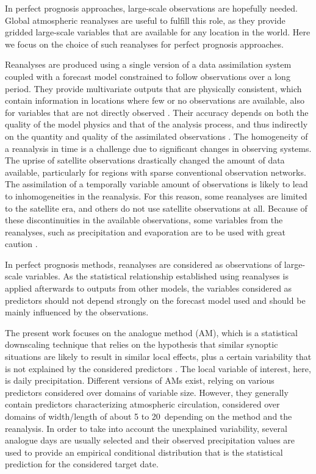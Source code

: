 \documentclass[smallextended]{svjour3}       %
\begin{document}
	In perfect prognosis approaches, large-scale observations are hopefully needed. Global atmospheric reanalyses are useful to fulfill this role, as they provide gridded large-scale variables that are available for any location in the world. Here we focus on the choice of such reanalyses for perfect prognosis approaches. 
	
	Reanalyses are produced using a single version of a data assimilation system coupled with a forecast model constrained to follow observations over a long period. They provide multivariate outputs that are physically consistent, which contain information in locations where few or no observations are available, also for variables that are not directly observed \citep{Gelaro2017}. Their accuracy depends on both the quality of the model physics and that of the analysis process, and thus indirectly on the quantity and quality of the assimilated observations \citep{Dee2011a}. The homogeneity of a reanalysis in time is a challenge due to significant changes in observing systems. The uprise of satellite observations drastically changed the amount of data available, particularly for regions with sparse conventional observation networks. The assimilation of a temporally variable amount of observations is likely to lead to inhomogeneities in the reanalysis. For this reason, some reanalyses are limited to the satellite era, and others do not use satellite observations at all. Because of these discontinuities in the available observations, some variables from the reanalyses, such as precipitation and evaporation are to be used with great caution \citep{Kobayashi2015}.
	
	In perfect prognosis methods, reanalyses are considered as observations of large-scale variables. As the statistical relationship established using reanalyses is applied afterwards to outputs from other models, the variables considered as predictors should not depend strongly on the forecast model used and should be mainly influenced by the observations.
	
	The present work focuses on the analogue method (AM), which is a statistical downscaling technique that relies on the hypothesis that similar synoptic situations are likely to result in similar local effects, plus a certain variability that is not explained by the considered predictors \citep{Lorenz1969}. The local variable of interest, here, is daily precipitation.  Different versions of AMs exist, relying on various predictors considered over domains of variable size. However, they generally contain predictors characterizing atmospheric circulation, considered over domains of width/length of about 5 to 20\degree\ depending on the method and the reanalysis. In order to take into account the unexplained variability, several analogue days are usually selected and their observed precipitation values are used to provide an empirical conditional distribution that is the statistical prediction for the considered target date.
	
\end{document}
